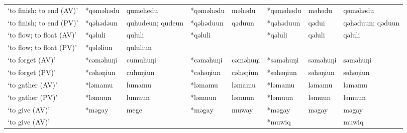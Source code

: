 \begin{landscape}
\begin{longtable}[c]{@{}p{3cm}<{\raggedright}p{2.75cm}<{\raggedright}p{2.75cm}<{\raggedright}p{2.75cm}<{\raggedright}p{2.75cm}<{\raggedright}p{2.75cm}<{\raggedright}p{2.75cm}<{\raggedright}p{2.75cm}<{\raggedright}@{}}
`to finish; to end (AV)'                             & *qəməhədu          & qumehedu                       & *qəməhədu          & məhədu                     & *qəməhədu        & məhədu                   & qəməhədu                          \\
`to finish; to end (PV)'                             & *qəhədəun          & quhudeun; qudeun               & *qəhəduun          & qəduun                     & *qəhəduun        & qədui                    & qəhəduun; qəduun                  \\
`to flow; to float (AV)'                             & *qəluli            & qululi                         & *qəluli            &                            & *qəluli          & qəluli                   & qəluli                            \\
`to flow; to float (PV)'                             & *qələliun          & qululiun                       &                    &                            &                  &                          &                                   \\
`to forget (AV)'                                     & *cəməhuŋi          & cumuhuŋi                       & *cəməhuŋi          & cəməhuŋi                   & *səməhuŋi        & səməhuŋi                 & səməhuŋi                          \\
`to forget (PV)'                                     & *cəhəŋiun          & cuhuŋiun                       & *cəhəŋiun          & cəhəŋiun                   & *səhəŋiun        & səhəŋiun                 & səhəŋiun                          \\
`to gather (AV)'                                     & *ləmamu            & lumamu                         & *ləmamu            & ləmamu                     & *ləmamu          & ləmamu                   & ləmamu                            \\
`to gather (PV)'                                     & *ləmuun            & lumuun                         & *ləmuun            & ləmuun                     & *ləmuun          & ləmuun                   & ləmuun                            \\
`to give (AV)'                                       & *məgay             & mege                           & *məgay             & muway                      & *məgay           & məgay                    & məgay                             \\
`to give (AV)'                                       &                    &                                &              &                            & *muwiq           &                          & muwiq                             \\

\end{longtable}
\end{landscape}
